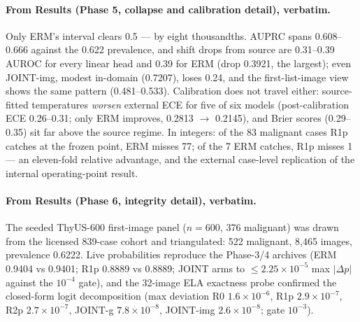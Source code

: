 \documentclass[11pt]{article}
\begin{document}
\paragraph{From Results (Phase 5, collapse and calibration detail), verbatim.}
Only ERM's interval clears 0.5 --- by eight thousandths. AUPRC spans
0.608--0.666 against the 0.622 prevalence, and shift drops from source
are 0.31--0.39 AUROC for every linear head and 0.39 for ERM (drop
0.3921, the largest); even JOINT-img, modest in-domain (0.7207), loses
0.24, and the first-list-image view shows the same pattern
(0.481--0.533). Calibration does not travel either: source-fitted
temperatures \emph{worsen} external ECE for five of six models
(post-calibration ECE 0.26--0.31; only ERM improves, 0.2813 $\to$
0.2145), and Brier scores (0.29--0.35) sit far above the source regime.
In integers: of the 83 malignant cases R1p catches at the frozen point,
ERM misses 77; of the 7 ERM catches, R1p misses 1 --- an eleven-fold
relative advantage, and the external case-level replication of the
internal operating-point result.

\paragraph{From Results (Phase 6, integrity detail), verbatim.}
The seeded ThyUS-600 first-image panel ($n{=}600$, 376 malignant) was
drawn from the licensed 839-case cohort and triangulated: 522 malignant,
8{,}465 images, prevalence 0.6222. Live probabilities reproduce the
Phase-3/4 archives (ERM 0.9404 vs 0.9401; R1p 0.8889 vs 0.8889; JOINT
arms to ${\leq}2.25{\times}10^{-5}$ max $|\Delta p|$ against the
$10^{-4}$ gate), and the 32-image ELA exactness probe confirmed the
closed-form logit decomposition (max deviation R0 $1.6{\times}10^{-6}$,
R1p $2.9{\times}10^{-7}$, R2p $2.7{\times}10^{-7}$, JOINT-g
$7.8{\times}10^{-8}$, JOINT-img $2.6{\times}10^{-8}$; gate $10^{-3}$).
\end{document}
